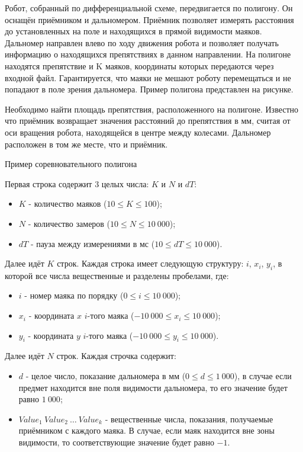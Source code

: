 
Робот, собранный по дифференциальной схеме, передвигается по полигону. Он оснащён приёмником и дальномером. 
Приёмник позволяет измерять расстояния до установленных на поле и находящихся в прямой видимости маяков.
Дальномер направлен влево по ходу движения робота и позволяет получать информацию о находящихся препятствиях в данном направлении. На полигоне находятся  препятствие  и K маяков, координаты которых передаются через входной файл. Гарантируется, что маяки не мешают роботу перемещаться и не попадают в поле зрения дальномера. Пример полигона представлен на рисунке.

Необходимо найти площадь препятствия, расположенного на полигоне. Известно что 
приёмник возвращает значения расстояний до препятствия в мм, считая от оси вращения робота, 
находящейся в центре между колесами. Дальномер расположен в том же месте, что и приёмник.


Пример соревновательного полигона

 
Первая строка содержит 3 целых числа: $K$ и $N$ и $dT$:

\begin{itemize}
    \item $K$ - количество маяков ($10 \leq K \leq 100$);
    \item $N$ - количество замеров ($10 \leq N \leq 10~000$);
    \item $dT$ - пауза между измерениями в мс ($10 \leq dT \leq 10~000$).
\end{itemize}

Далее идёт $K$ строк. Каждая строка имеет следующую структуру: $i$, $x_i$, $y_i$, в которой все числа вещественные и разделены пробелами, где:

\begin{itemize}
    \item $i$ - номер маяка по порядку ($0 \leq i \leq 10~000$);
    \item $x_i$ - координата $x$ $i$-того маяка ($-10~000 \leq x_i \leq 10~000$);
    \item $y_i$ - координата $y$ $i$-того маяка ($-10~000 \leq y_i \leq 10~000$).
\end{itemize}

Далее идёт $N$ строк. Каждая строчка содержит:

\begin{itemize}
    \item $d$ - целое число, показание дальномера в мм ($0 \leq d \leq 1~000$), в случае если предмет находится вне поля видимости дальномера, то его значение будет равно $1~000$;
    \item $Value_{1} ~Value_2 ~\dots ~Value_k$ - вещественные числа, показания, получаемые приёмником с каждого маяка. В случае, если маяк находится вне зоны видимости, то соответствующие значение будет равно $-1$.
\end{itemize}

